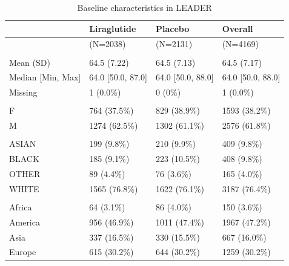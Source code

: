 \documentclass[
]{article}
\begin{document}
\begingroup\fontsize{9}{11}\selectfont

\begin{longtable}[t]{llll}
\caption{\label{tab:unnamed-chunk-4}Baseline characteristics in LEADER}\\
\toprule
  & Liraglutide & Placebo & Overall\\
\midrule
 & (N=2038) & (N=2131) & (N=4169)\\
\addlinespace[0.3em]
\multicolumn{4}{l}{\textbf{AGE}}\\
\hspace{1em}Mean (SD) & 64.5 (7.22) & 64.5 (7.13) & 64.5 (7.17)\\
\hspace{1em}Median [Min, Max] & 64.0 [50.0, 87.0] & 64.0 [50.0, 88.0] & 64.0 [50.0, 88.0]\\
\hspace{1em}Missing & 1 (0.0\%) & 0 (0\%) & 1 (0.0\%)\\
\addlinespace[0.3em]
\multicolumn{4}{l}{\textbf{SEX}}\\
\hspace{1em}F & 764 (37.5\%) & 829 (38.9\%) & 1593 (38.2\%)\\
\hspace{1em}M & 1274 (62.5\%) & 1302 (61.1\%) & 2576 (61.8\%)\\
\addlinespace[0.3em]
\multicolumn{4}{l}{\textbf{RACE}}\\
\hspace{1em}ASIAN & 199 (9.8\%) & 210 (9.9\%) & 409 (9.8\%)\\
\hspace{1em}BLACK & 185 (9.1\%) & 223 (10.5\%) & 408 (9.8\%)\\
\hspace{1em}OTHER & 89 (4.4\%) & 76 (3.6\%) & 165 (4.0\%)\\
\hspace{1em}WHITE & 1565 (76.8\%) & 1622 (76.1\%) & 3187 (76.4\%)\\
\addlinespace[0.3em]
\multicolumn{4}{l}{\textbf{COUNTRY}}\\
\hspace{1em}Africa & 64 (3.1\%) & 86 (4.0\%) & 150 (3.6\%)\\
\hspace{1em}America & 956 (46.9\%) & 1011 (47.4\%) & 1967 (47.2\%)\\
\hspace{1em}Asia & 337 (16.5\%) & 330 (15.5\%) & 667 (16.0\%)\\
\hspace{1em}Europe & 615 (30.2\%) & 644 (30.2\%) & 1259 (30.2\%)\\

\end{longtable}
\end{document}
